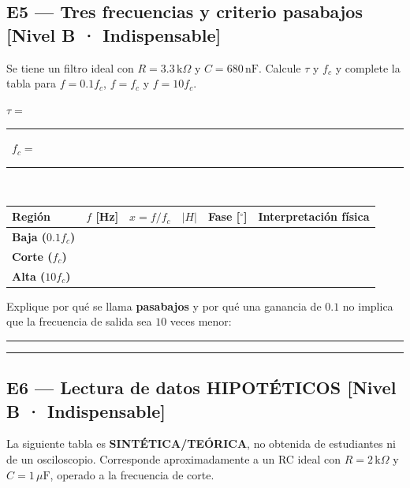 \documentclass[11pt, a4paper]{article}
\begin{document}
\newpage
\subsection*{E5 — Tres frecuencias y criterio pasabajos \hfill \textnormal{\small [Nivel B · Indispensable]}}
Se tiene un filtro ideal con $R = 3.3\,\text{k}\Omega$ y $C = 680\,\text{nF}$. Calcule $\tau$ y $f_c$ y complete la tabla para $f = 0.1f_c$, $f = f_c$ y $f = 10f_c$.

\vspace{0.15cm}
\noindent $\tau =$ \rule{3.2cm}{0.4pt}\, \hspace{1.2cm} $f_c =$ \rule{3.2cm}{0.4pt}\,

\vspace{0.2cm}
\renewcommand{\arraystretch}{1.6}
\noindent
\begin{tabularx}{\textwidth}{
  >{\bfseries\RaggedRight}p{2.3cm}
  >{\centering\arraybackslash}p{2.2cm}
  >{\centering\arraybackslash}p{2.0cm}
  >{\centering\arraybackslash}p{2.0cm}
  >{\centering\arraybackslash}p{2.1cm}
  >{\RaggedRight\arraybackslash}X}
\toprule
\textbf{Región} & \textbf{$f$ [Hz]} & \textbf{$x = f/f_c$} & \textbf{$|H|$} & \textbf{Fase [$^\circ$]} & \textbf{Interpretación física} \\
\midrule
Baja ($0.1f_c$) & & & & & \\
Corte ($f_c$)   & & & & & \\
Alta ($10f_c$)  & & & & & \\
\bottomrule
\end{tabularx}

\vspace{0.2cm}
\noindent Explique por qué se llama \textbf{pasabajos} y por qué una ganancia de $0.1$ no implica que la frecuencia de salida sea $10$ veces menor:\par\vspace{0.35cm}
\noindent\rule{\textwidth}{0.3pt}\par\vspace{0.45cm}
\noindent\rule{\textwidth}{0.3pt}

\subsection*{E6 — Lectura de datos HIPOTÉTICOS \hfill \textnormal{\small [Nivel B · Indispensable]}}
La siguiente tabla es \textbf{SINTÉTICA/TEÓRICA}, no obtenida de estudiantes ni de un osciloscopio. Corresponde aproximadamente a un RC ideal con $R = 2\,\text{k}\Omega$ y $C = 1\,\mu\text{F}$, operado a la frecuencia de corte.
\end{document}
